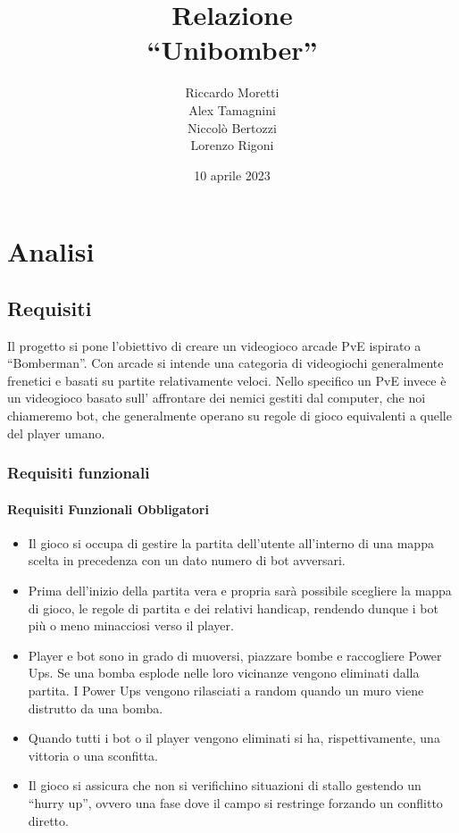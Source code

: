 \documentclass[a4paper,12pt]{report}
\title{Relazione \\``Unibomber''}
\author{Riccardo Moretti \\ Alex Tamagnini \\ Niccolò Bertozzi \\Lorenzo Rigoni}
\date{10 aprile 2023}
\begin{document}
\maketitle

\tableofcontents

\chapter{Analisi}

\section{Requisiti}
Il progetto si pone l’obiettivo di creare un videogioco arcade PvE ispirato a “Bomberman”. Con arcade si intende una categoria di videogiochi generalmente frenetici e basati su partite relativamente veloci. Nello specifico un PvE invece è un videogioco basato sull’ affrontare dei nemici gestiti dal computer, che noi chiameremo bot, che generalmente operano su regole di gioco equivalenti a quelle del player umano.

\subsection*{Requisiti funzionali}
\subsubsection{Requisiti Funzionali Obbligatori}
\begin{itemize}
    \item Il gioco si occupa di gestire la partita dell’utente all’interno di una mappa scelta in precedenza con un dato numero di bot avversari.
    \item Prima dell’inizio della partita vera e propria sarà possibile scegliere la mappa di gioco, le regole di partita e dei relativi handicap, rendendo dunque i bot più o meno minacciosi verso il player.
    \item Player e bot sono in grado di muoversi, piazzare bombe e raccogliere Power Ups. Se una bomba esplode nelle loro vicinanze vengono eliminati dalla partita. I Power Ups vengono rilasciati a random quando un muro viene distrutto da una bomba.
    \item Quando tutti i bot o il player vengono eliminati si ha, rispettivamente, una vittoria o una sconfitta.
    \item Il gioco si assicura che non si verifichino situazioni di stallo gestendo un “hurry up”, ovvero una fase dove il campo si restringe forzando un conflitto diretto.

\end{itemize}
\end{document}
